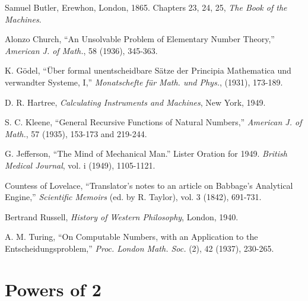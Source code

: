 \documentclass[10pt,twoside,openright]{memoir}
\begin{document}
\begin{hangparas}{1.5em}{1}

Samuel Butler, Erewhon, London, 1865. Chapters 23, 24, 25, \emph{The Book of the Machines}.

Alonzo Church, ``An Unsolvable Problem of Elementary Number Theory,'' \emph{American J. of Math.}, 58 (1936), 345-363.

K. G\"odel, ``\"Uber formal unentscheidbare S\"atze der Principia Mathematica und verwandter Systeme, I,'' \emph{Monatschefte f\"ur Math. und Phys.}, (1931), 173-189.

D. R. Hartree, \emph{Calculating Instruments and Machines}, New York, 1949.

S. C. Kleene, ``General Recursive Functions of Natural Numbers,'' \emph{American J. of Math.}, 57 (1935), 153-173 and 219-244.

G. Jefferson, ``The Mind of Mechanical Man.'' Lister Oration for 1949. \emph{British Medical Journal}, vol. i (1949), 1105-1121.

Countess of Lovelace, ``Translator's notes to an article on Babbage's Analytical Engine,'' \emph{Scientific Memoirs} (ed. by R. Taylor), vol. 3 (1842), 691-731.

Bertrand Russell, \emph{History of Western Philosophy}, London, 1940.

A. M. Turing, ``On Computable Numbers, with an Application to the Entscheidungsproblem,'' \emph{Proc. London Math. Soc.} (2), 42 (1937), 230-265.
\end{hangparas}


\chapter{Powers of 2}
\end{document}
